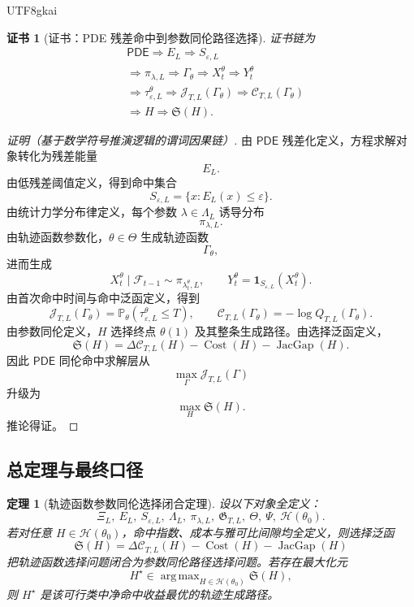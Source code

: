 \documentclass[12pt]{article}
\newtheorem{theorem}{定理}[section]
\newtheorem{Certificate}{证书}[section]
\newcommand{\PDE}{\ensuremath{\mathsf{PDE}}}
\newcommand{\Prob}{\mathbb P}
\newcommand{\Fil}{\mathcal F}
\DeclareMathOperator{\Cost}{Cost}
\DeclareMathOperator{\JacGap}{JacGap}
\DeclareMathOperator*{\argmax}{arg\,max}
\begin{document}
\begin{CJK*}{UTF8}{gkai}
\begin{Certificate}[证书：PDE 残差命中到参数同伦路径选择]
\label{cert:tex57-pde-upgrade}
证书链为
\[
\begin{aligned}
&\PDE
\Longrightarrow
E_L
\Longrightarrow
S_{\varepsilon,L}\\
&\Longrightarrow
\pi_{\lambda,L}
\Longrightarrow
\Gamma_\theta
\Longrightarrow
X_t^\theta
\Longrightarrow
Y_t^\theta\\
&\Longrightarrow
\tau_{\varepsilon,L}^{\theta}
\Longrightarrow
\mathcal J_{T,L}(\Gamma_\theta)
\Longrightarrow
\mathcal C_{T,L}(\Gamma_\theta)\\
&\Longrightarrow
H
\Longrightarrow
\mathfrak S(H).
\end{aligned}
\]
\end{Certificate}

\begin{proof}[证明（基于数学符号推演逻辑的谓词因果链）]
由 \PDE{} 残差化定义，方程求解对象转化为残差能量
\[
  E_L.
\]
由低残差阈值定义，得到命中集合
\[
  S_{\varepsilon,L}
  =
  \{x:E_L(x)\le\varepsilon\}.
\]
由统计力学分布律定义，每个参数 \(\lambda\in\Lambda_L\) 诱导分布
\[
  \pi_{\lambda,L}.
\]
由轨迹函数参数化，\(\theta\in\Theta\) 生成轨迹函数
\[
  \Gamma_\theta,
\]
进而生成
\[
  X_t^\theta\mid\Fil_{t-1}\sim\pi_{\lambda_t^\theta,L},
  \qquad
  Y_t^\theta=\mathbf 1_{S_{\varepsilon,L}}(X_t^\theta).
\]
由首次命中时间与命中泛函定义，得到
\[
  \mathcal J_{T,L}(\Gamma_\theta)
  =
  \Prob_\theta(\tau_{\varepsilon,L}^{\theta}\le T),
  \qquad
  \mathcal C_{T,L}(\Gamma_\theta)
  =
  -\log Q_{T,L}(\Gamma_\theta).
\]
由参数同伦定义，\(H\) 选择终点 \(\theta(1)\) 及其整条生成路径。由选择泛函定义，
\[
  \mathfrak S(H)
  =
  \Delta\mathcal C_{T,L}(H)
  -
  \Cost(H)
  -
  \JacGap(H).
\]
因此 \PDE{} 同伦命中求解层从
\[
  \max_\Gamma\mathcal J_{T,L}(\Gamma)
\]
升级为
\[
  \max_H\mathfrak S(H).
\]
推论得证。
\end{proof}

\subsection{总定理与最终口径}
\label{subsec:tex57-total-theorem}

\begin{theorem}[轨迹函数参数同伦选择闭合定理]
\label{thm:tex57-total-closure}
设以下对象全定义：
\[
  \Xi_L,\ E_L,\ S_{\varepsilon,L},\ \Lambda_L,\ \pi_{\lambda,L},\
  \mathfrak G_{T,L},\ \Theta,\ \Psi,\ \mathcal H(\theta_0).
\]
若对任意 \(H\in\mathcal H(\theta_0)\)，命中指数、成本与雅可比间隙均全定义，则选择泛函
\[
  \mathfrak S(H)
  =
  \Delta\mathcal C_{T,L}(H)
  -
  \Cost(H)
  -
  \JacGap(H)
\]
把轨迹函数选择问题闭合为参数同伦路径选择问题。若存在最大化元
\[
  H^\star\in\argmax_{H\in\mathcal H(\theta_0)}\mathfrak S(H),
\]
则 \(H^\star\) 是该可行类中净命中收益最优的轨迹生成路径。
\end{theorem}


\end{CJK*}
\end{document}
